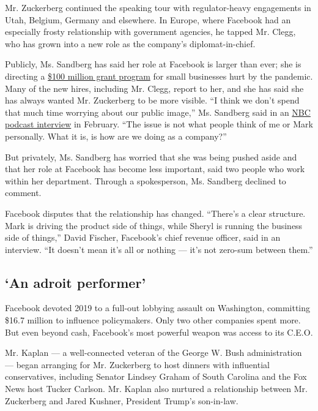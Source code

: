 Mr. Zuckerberg continued the speaking tour with regulator-heavy
engagements in Utah, Belgium, Germany and elsewhere. In Europe, where
Facebook had an especially frosty relationship with government agencies,
he tapped Mr. Clegg, who has grown into a new role as the company's
diplomat-in-chief.

Publicly, Ms. Sandberg has said her role at Facebook is larger than
ever; she is directing a
\href{https://www.facebookcorewwwi.onion/business/boost/grants}{\$100
million grant program} for small businesses hurt by the pandemic. Many
of the new hires, including Mr. Clegg, report to her, and she has said
she has always wanted Mr. Zuckerberg to be more visible. ``I think we
don't spend that much time worrying about our public image,'' Ms.
Sandberg said in an
\href{https://www.nbcnews.com/podcast/byers-market/transcript-facebook-s-sheryl-sandberg-n1145051}{NBC
podcast interview} in February. ``The issue is not what people think of
me or Mark personally. What it is, is how are we doing as a company?''

But privately, Ms. Sandberg has worried that she was being pushed aside
and that her role at Facebook has become less important, said two people
who work within her department. Through a spokesperson, Ms. Sandberg
declined to comment.

Facebook disputes that the relationship has changed. ``There's a clear
structure. Mark is driving the product side of things, while Sheryl is
running the business side of things,'' David Fischer, Facebook's chief
revenue officer, said in an interview. ``It doesn't mean it's all or
nothing --- it's not zero-sum between them.''

\hypertarget{an-adroit-performer}{%
\subsection{`An adroit performer'}\label{an-adroit-performer}}

Facebook devoted 2019 to a full-out lobbying assault on Washington,
committing \$16.7 million to influence policymakers. Only two other
companies spent more. But even beyond cash, Facebook's most powerful
weapon was access to its C.E.O.

Mr. Kaplan --- a well-connected veteran of the George W. Bush
administration --- began arranging for Mr. Zuckerberg to host dinners
with influential conservatives, including Senator Lindsey Graham of
South Carolina and the Fox News host Tucker Carlson. Mr. Kaplan also
nurtured a relationship between Mr. Zuckerberg and Jared Kushner,
President Trump's son-in-law.

